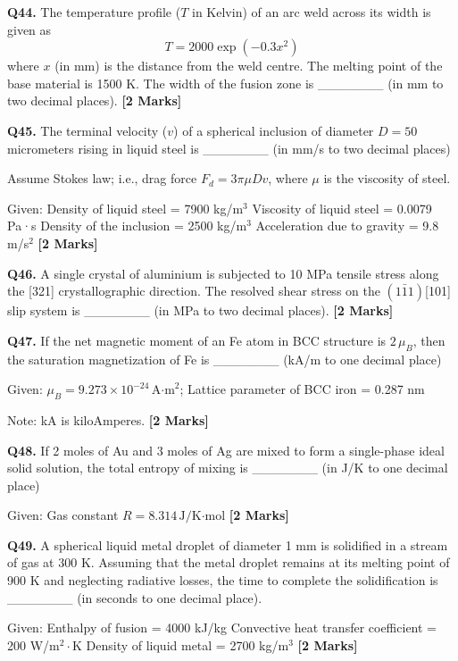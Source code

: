 \documentclass[11pt]{article}
\newcommand{\questionb}[2]{
    \noindent\textbf{Q#2.} #1 \hfill \textbf{[2 Marks]}
}
\begin{document}
\questionb{The temperature profile (\(T\) in Kelvin) of an arc weld across its width is given as  
\[ T = 2000 \exp(-0.3x^2) \]  
where \(x\) (in mm) is the distance from the weld centre. The melting point of the base material is 1500 K. The width of the fusion zone is \_\_\_\_\_\_\_ (in mm to two decimal places).}{44}
\vspace{0.5cm}

\questionb{The terminal velocity (\(v\)) of a spherical inclusion of diameter \(D = 50\) micrometers rising in liquid steel is \_\_\_\_\_\_\_ (in mm/s to two decimal places)  

Assume Stokes law; i.e., drag force \(F_d = 3\pi\mu D v\), where \(\mu\) is the viscosity of steel.  

Given:  
Density of liquid steel = 7900 kg/m\(^3\)  
Viscosity of liquid steel = 0.0079 Pa·s  
Density of the inclusion = 2500 kg/m\(^3\)  
Acceleration due to gravity = 9.8 m/s\(^2\)}{45}
\vspace{0.5cm}

\questionb{A single crystal of aluminium is subjected to 10 MPa tensile stress along the [321] crystallographic direction. The resolved shear stress on the \((1\bar{1}1)\)[101] slip system is \_\_\_\_\_\_\_ (in MPa to two decimal places).}{46}
\vspace{0.5cm}

\questionb{If the net magnetic moment of an Fe atom in BCC structure is \(2\,\mu_B\), then the saturation magnetization of Fe is \_\_\_\_\_\_\_ (kA/m to one decimal place)  

Given: \(\mu_B = 9.273 \times 10^{-24}\, \text{A·m}^2\); Lattice parameter of BCC iron = 0.287 nm  

Note: kA is kiloAmperes.}{47}
\vspace{0.5cm}

\questionb{If 2 moles of Au and 3 moles of Ag are mixed to form a single-phase ideal solid solution, the total entropy of mixing is \_\_\_\_\_\_\_ (in J/K to one decimal place)  

Given: Gas constant \(R = 8.314\, \text{J/K·mol}\)}{48}
\vspace{0.5cm}

\questionb{A spherical liquid metal droplet of diameter 1 mm is solidified in a stream of gas at 300 K. Assuming that the metal droplet remains at its melting point of 900 K and neglecting radiative losses, the time to complete the solidification is \_\_\_\_\_\_\_ (in seconds to one decimal place).  

Given:  
Enthalpy of fusion = 4000 kJ/kg  
Convective heat transfer coefficient = 200 W/m\(^2\cdot\)K  
Density of liquid metal = 2700 kg/m\(^3\)}{49}
\vspace{0.5cm}
\end{document}
